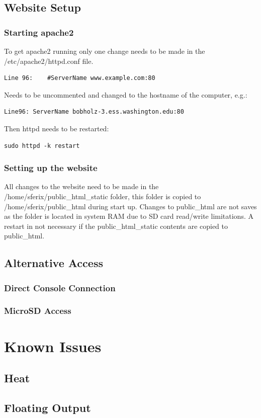\subsection{Website Setup}

\subsubsection{Starting apache2}

To get apache2 running only one change needs to be made in the /etc/apache2/httpd.conf file.

\begin{verbatim}
Line 96:	#ServerName www.example.com:80
\end{verbatim}

Needs to be uncommented and changed to the hostname of the computer, e.g.:

\begin{verbatim}
Line96:	ServerName bobholz-3.ess.washington.edu:80
\end{verbatim}

Then httpd needs to be restarted:

\begin{verbatim}
sudo httpd -k restart
\end{verbatim}

\subsubsection{Setting up the website}

All changes to the website need to be made in the /home/sferix/public\_html\_static folder, this folder is copied to /home/sferix/public\_html during start up.
Changes to public\_html are not saves as the folder is located in system RAM due to SD card read/write limitations.
A restart in not necessary if the public\_html\_static contents are copied to public\_html.

\subsection{Alternative Access}

\subsubsection{Direct Console Connection}


\subsubsection{MicroSD Access}


\section{Known Issues}

\subsection{Heat}


\subsection{Floating Output}

